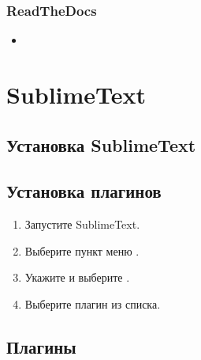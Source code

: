 \documentclass[a4paper,12pt,russian]{sphinxmanual}
\begin{document}
\subsubsection{ReadTheDocs}
\label{\detokenize{start:readthedocs}}\begin{itemize}
\item {} 
\begin{quote}
\end{quote}

\end{itemize}


\section{SublimeText}
\label{\detokenize{editor:sublimetext}}\label{\detokenize{editor::doc}}

\subsection{Установка SublimeText}
\label{\detokenize{editor:id1}}


\subsection{Установка плагинов}
\label{\detokenize{editor:id3}}\begin{enumerate}
%
\item {} 
Запустите SublimeText.

\item {} 
Выберите пункт меню .

\item {} 
Укажите  и выберите .

\item {} 
Выберите плагин из списка.

\end{enumerate}


\subsection{Плагины}
\label{\detokenize{editor:id4}}
\end{document}
